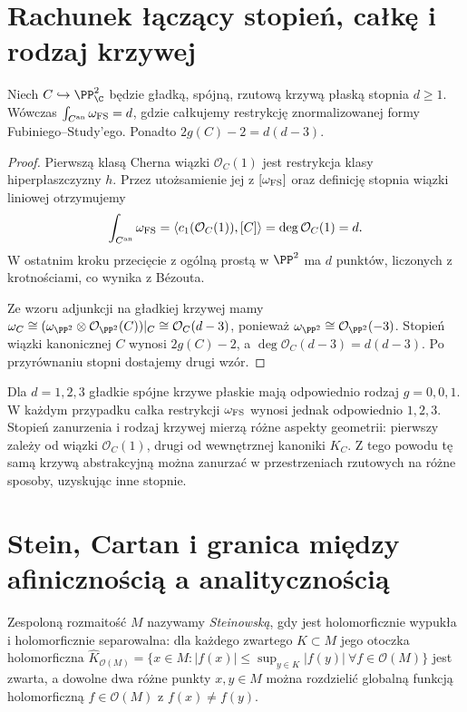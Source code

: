 \section{Rachunek łączący stopień, całkę i rodzaj krzywej}
\label{sec:ga9-degree-genus}

\begin{stwierdzenie}
Niech $C\hookrightarrow\PP^2_\C$ będzie gładką,
spójną, rzutową krzywą płaską stopnia $d\ge1$.
Wówczas
$\int_{C^{\rm an}}\omega_{\rm FS}=d$,
gdzie całkujemy restrykcję znormalizowanej formy
Fubiniego--Study'ego. Ponadto
$2g(C)-2=d(d-3)$.
\end{stwierdzenie}
\begin{proof}
Pierwszą klasą Cherna wiązki $\mathcal O_C(1)$
jest restrykcja klasy hiperpłaszczyzny $h$.
Przez utożsamienie jej z $[\omega_{\rm FS}]$
oraz definicję stopnia wiązki liniowej otrzymujemy
\[
 \int_{C^{\rm an}}\omega_{\rm FS}
 =\langle c_1(\mathcal O_C(1)),[C]\rangle
 =\deg\mathcal O_C(1)=d.
\]
W ostatnim kroku przecięcie z ogólną prostą w
$\PP^2$ ma $d$ punktów, liczonych z krotnościami,
co wynika z Bézouta.

Ze wzoru adjunkcji na gładkiej krzywej mamy
$\omega_C\cong
(\omega_{\PP^2}\otimes\mathcal O_{\PP^2}(C))|_C
\cong\mathcal O_C(d-3)$,
ponieważ $\omega_{\PP^2}\cong\mathcal O_{\PP^2}(-3)$.
Stopień wiązki kanonicznej $C$ wynosi $2g(C)-2$,
a $\deg\mathcal O_C(d-3)=d(d-3)$. Po przyrównaniu
stopni dostajemy drugi wzór.
\end{proof}

\begin{przyklad}
Dla $d=1,2,3$ gładkie spójne krzywe płaskie mają
odpowiednio rodzaj $g=0,0,1$. W każdym przypadku
całka restrykcji $\omega_{\rm FS}$ wynosi jednak
odpowiednio $1,2,3$. Stopień zanurzenia i rodzaj
krzywej mierzą różne aspekty geometrii: pierwszy
zależy od wiązki $\mathcal O_C(1)$, drugi od
wewnętrznej kanoniki $K_C$. Z tego powodu tę samą
krzywą abstrakcyjną można zanurzać w przestrzeniach
rzutowych na różne sposoby, uzyskując inne stopnie.
\end{przyklad}

\section{Stein, Cartan i granica między afinicznością a analitycznością}
\label{sec:ga9-stein}

\begin{definicja}
Zespoloną rozmaitość $M$ nazywamy \emph{Steinowską},
gdy jest holomorficznie wypukła i holomorficznie
separowalna: dla każdego zwartego $K\subset M$
jego otoczka holomorficzna
$\widehat K_{\mathcal O(M)}=
 \{x\in M:|f(x)|\le\sup_{y\in K}|f(y)|\ \forall f\in\mathcal O(M)\}$
jest zwarta, a dowolne dwa różne punkty $x,y\in M$
można rozdzielić globalną funkcją holomorficzną
$f\in\mathcal O(M)$ z $f(x)\ne f(y)$.
\end{definicja}

